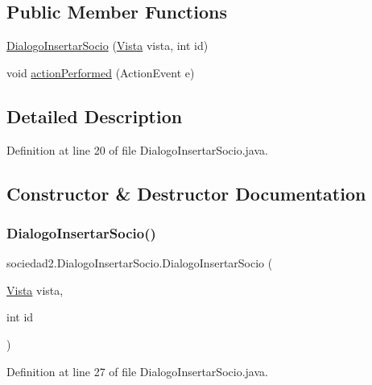 \subsection*{Public Member Functions}
\begin{DoxyCompactItemize}
\item 
\mbox{\hyperlink{classsociedad2_1_1_dialogo_insertar_socio_a1467bf782876cdc9424744d6eafaad4e}{Dialogo\+Insertar\+Socio}} (\mbox{\hyperlink{classsociedad2_1_1_vista}{Vista}} vista, int id)
\item 
void \mbox{\hyperlink{classsociedad2_1_1_dialogo_insertar_socio_a8cff370d2d035c22b84b0257391ff93f}{action\+Performed}} (Action\+Event e)
\end{DoxyCompactItemize}


\subsection{Detailed Description}


Definition at line 20 of file Dialogo\+Insertar\+Socio.\+java.



\subsection{Constructor \& Destructor Documentation}
\mbox{\label{classsociedad2_1_1_dialogo_insertar_socio_a1467bf782876cdc9424744d6eafaad4e}} 
\subsubsection{\texorpdfstring{Dialogo\+Insertar\+Socio()}{DialogoInsertarSocio()}}
{\footnotesize\ttfamily sociedad2.\+Dialogo\+Insertar\+Socio.\+Dialogo\+Insertar\+Socio (\begin{DoxyParamCaption}\item[{\mbox{\hyperlink{classsociedad2_1_1_vista}{Vista}}}]{vista,  }\item[{int}]{id }\end{DoxyParamCaption})}



Definition at line 27 of file Dialogo\+Insertar\+Socio.\+java.



